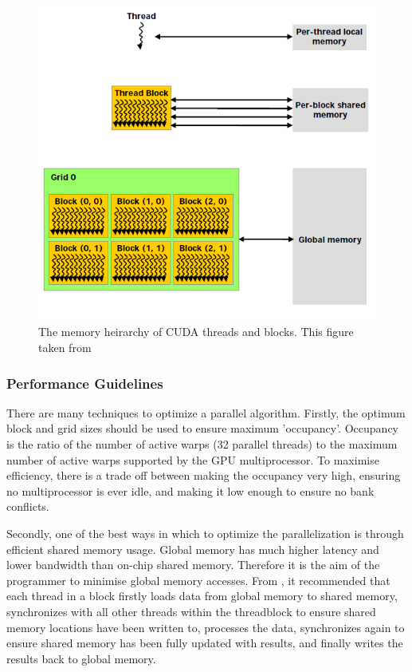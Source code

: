 \begin{figure}[p]
	\centering
		\includegraphics[scale=0.4]{images/cudamemory.PNG}
		\caption{The memory heirarchy of CUDA threads and blocks. This figure taken from \cite{cuda}}
	\label{fig:cudamemory}
\end{figure}

		\subsubsection{Performance Guidelines}
There are many techniques to optimize a parallel algorithm. Firstly, the optimum block and grid sizes should be used to ensure maximum 'occupancy'. Occupancy is the ratio of the number of active warps (32 parallel threads) to the maximum number of active warps supported by the GPU multiprocessor. To maximise efficiency, there is a trade off between making the occupancy very high, ensuring no multiprocessor is ever idle, and making it low enough to ensure no bank conflicts.

Secondly, one of the best ways in which to optimize the parallelization is through efficient shared memory usage. Global memory has much higher latency and lower bandwidth than on-chip shared memory. Therefore it is the aim of the programmer to minimise global memory accesses. From \cite{cuda}, it recommended that each thread in a block firstly loads data from global memory to shared memory, synchronizes with all other threads within the threadblock to ensure shared memory locations have been written to, processes the data, synchronizes again to ensure shared memory has been fully updated with results, and finally writes the results back to global memory.